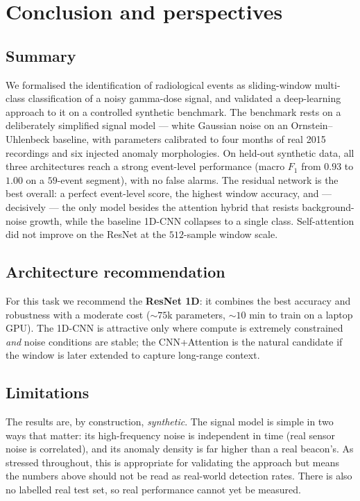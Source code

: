 \chapter{Conclusion and perspectives}
\label{chap:conclusion}

\section{Summary}
\label{sec:conc-summary}

We formalised the identification of radiological events as sliding-window
multi-class classification of a noisy gamma-dose signal, and validated a
deep-learning approach to it on a controlled synthetic benchmark. The benchmark
rests on a deliberately simplified signal model --- white Gaussian noise on an
Ornstein--Uhlenbeck baseline, with parameters calibrated to four months of real
2015 recordings and six injected anomaly morphologies. On held-out synthetic
data, all three architectures reach a strong event-level performance (macro $F_1$
from $0.93$ to $1.00$ on a $59$-event segment), with no false alarms. The
residual network is the best overall: a perfect event-level score, the highest
window accuracy, and --- decisively --- the only model besides the attention
hybrid that resists background-noise growth, while the baseline 1D-CNN collapses
to a single class. Self-attention did not improve on the ResNet at the
$512$-sample window scale.

\section{Architecture recommendation}
\label{sec:conc-reco}

For this task we recommend the \textbf{ResNet 1D}: it combines the best accuracy
and robustness with a moderate cost ($\sim 75$k parameters, $\sim 10$ min to
train on a laptop GPU). The 1D-CNN is attractive only where compute is extremely
constrained \emph{and} noise conditions are stable; the CNN+Attention is the
natural candidate if the window is later extended to capture long-range context.

\section{Limitations}
\label{sec:conc-limits}

The results are, by construction, \emph{synthetic}. The signal model is simple in
two ways that matter: its high-frequency noise is independent in time (real
sensor noise is correlated), and its anomaly density is far higher than a real
beacon's. As stressed throughout, this is appropriate for validating the
approach but means the numbers above should not be read as real-world detection
rates. There is also no labelled real test set, so real performance cannot yet be
measured.

